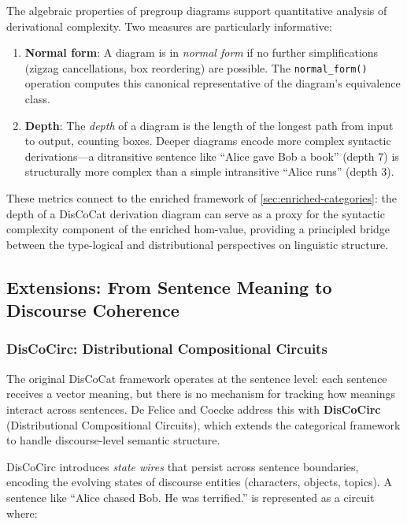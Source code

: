 \documentclass[
]{article}
\numberwithin{equation}{section}
\begin{document}
The algebraic properties of pregroup diagrams support quantitative
analysis of derivational complexity. Two measures are particularly
informative:

\begin{enumerate}
\def\labelenumi{\arabic{enumi}.}
\item
  \textbf{Normal form}: A diagram is in \emph{normal form} if no further
  simplifications (zigzag cancellations, box reordering) are possible.
  The \texttt{normal\_form()} operation computes this canonical
  representative of the diagram's equivalence class.
\item
  \textbf{Depth}: The \emph{depth} of a diagram is the length of the
  longest path from input to output, counting boxes. Deeper diagrams
  encode more complex syntactic derivations---a ditransitive sentence
  like ``Alice gave Bob a book'' (depth 7) is structurally more complex
  than a simple intransitive ``Alice runs'' (depth 3).
\end{enumerate}

These metrics connect to the enriched framework of
\autoref{sec:enriched-categories}: the depth of a DisCoCat derivation
diagram can serve as a proxy for the syntactic complexity component of
the enriched hom-value, providing a principled bridge between the
type-logical and distributional perspectives on linguistic structure.

\subsection{Extensions: From Sentence Meaning to Discourse
Coherence}\label{extensions-from-sentence-meaning-to-discourse-coherence}

\subsubsection{DisCoCirc: Distributional Compositional
Circuits}\label{discocirc-distributional-compositional-circuits}

The original DisCoCat framework operates at the sentence level: each
sentence receives a vector meaning, but there is no mechanism for
tracking how meanings interact across sentences. De Felice and Coecke
\citeyearpar{defelice2020discourse} address this with \textbf{DisCoCirc}
(Distributional Compositional Circuits), which extends the categorical
framework to handle discourse-level semantic structure.

DisCoCirc introduces \emph{state wires} that persist across sentence
boundaries, encoding the evolving states of discourse entities
(characters, objects, topics). A sentence like ``Alice chased Bob. He
was terrified.'' is represented as a circuit where:
\end{document}
